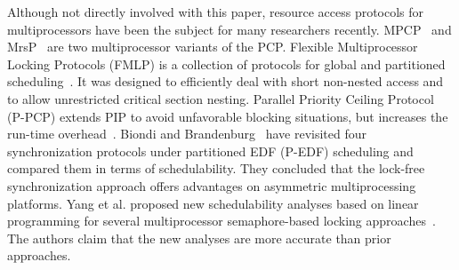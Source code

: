 Although not directly involved with this paper, resource access protocols for 
multiprocessors have been the subject for many researchers recently. 
MPCP~\cite{Rajkumar:1990} and MrsP~\cite{Burns:2013} are two multiprocessor 
variants of the PCP. Flexible Multiprocessor Locking Protocols (FMLP) is a 
collection of protocols for global and partitioned scheduling~\cite{Block:2007}. 
It was designed to efficiently deal with short non-nested access and to allow 
unrestricted critical section nesting. Parallel Priority Ceiling Protocol 
(P-PCP) extends PIP to avoid unfavorable blocking situations, but increases the 
run-time overhead~\cite{Easwaran:2009}. Biondi and 
Brandenburg~\cite{Biondi:2016} have revisited four synchronization protocols 
under partitioned EDF (P-EDF) scheduling and compared them in terms of 
schedulability. They concluded that the lock-free synchronization approach 
offers advantages on asymmetric multiprocessing platforms. Yang et al. proposed 
new schedulability analyses based on linear programming for several 
multiprocessor semaphore-based locking approaches~\cite{Yang:2015}. The authors 
claim that the new analyses are more accurate than prior approaches.   